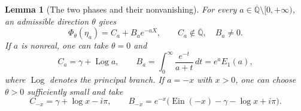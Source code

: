 \documentclass[11pt,a4paper]{article}
\newtheorem{lemma}[theorem]{Lemma}
\theoremstyle{definition}
\theoremstyle{remark}
\numberwithin{equation}{section}
\begin{document}
\begin{lemma}[The two phases and their nonvanishing]
\label{p3:ef:phase}
For every $a\in\overline{\mathbb Q}\setminus[0,+\infty)$, an admissible
direction $\theta$ gives
\begin{equation}\label{p3:ef:phase-equation}
 \Phi_\theta(\eta_a)=C_a+B_a e^{-aX},
 \qquad C_a\notin\overline{\mathbb Q},\quad B_a\ne0.
\end{equation}
If $a$ is nonreal, one can take $\theta=0$ and
\begin{equation}\label{p3:ef:phase-coefficients}
 C_a=\gamma+\operatorname{Log}a,
 \qquad
 B_a=\int_0^\infty\frac{e^{-t}}{a+t}\,dt=e^aE_1(a),
\end{equation}
where $\operatorname{Log}$ denotes the principal branch.
If $a=-x$ with $x>0$, one can choose $\theta>0$ sufficiently small and
take
\begin{equation}\label{p3:ef:negative-phase}
 C_{-x}=\gamma+\log x-i\pi,
 \qquad
 B_{-x}=e^{-x}\bigl(\operatorname{Ein}(-x)-\gamma-\log x+i\pi\bigr).
\end{equation}
\end{lemma}
\end{document}
